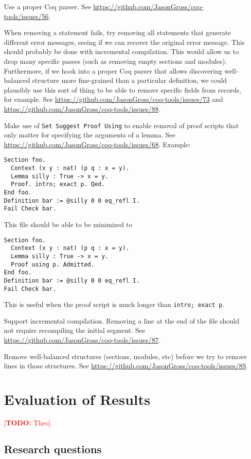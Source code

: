 \documentclass[sigplan,10pt,review,anonymous]{acmart}
\makeatletter
\newcommand{\todo}[1]{%
\@latex@warning{TODO: \detokenize{#1} on page \thepage}%
\textcolor{red}{[\textbf{TODO:} #1]}}%
\makeatother
\begin{document}
Use a proper Coq parser.
See \url{https://github.com/JasonGross/coq-tools/issues/56}.

When removing a statement fails, try removing all statements that generate different error messages, seeing if we can recover the original error message.
This should probably be done with incremental compilation.
This would allow us to drop many specific passes (such as removing empty sections and modules).
Furthermore, if we hook into a proper Coq parser that allows discovering well-balanced structure more fine-grained than a particular definition, we could plausibly use this sort of thing to be able to remove specific fields from records, for example.
See \url{https://github.com/JasonGross/coq-tools/issues/73} and \url{https://github.com/JasonGross/coq-tools/issues/88}.

Make use of \verb|Set Suggest Proof Using| to enable removal of proof scripts that only matter for specifying the arguments of a lemma.
See \url{https://github.com/JasonGross/coq-tools/issues/68}.
Example:
\begin{verbatim}
Section foo.
  Context (x y : nat) (p q : x = y).
  Lemma silly : True -> x = y.
  Proof. intro; exact p. Qed.
End foo.
Definition bar := @silly 0 0 eq_refl I.
Fail Check bar.
\end{verbatim}
This file should be able to be minimized to
\begin{verbatim}
Section foo.
  Context (x y : nat) (p q : x = y).
  Lemma silly : True -> x = y.
  Proof using p. Admitted.
End foo.
Definition bar := @silly 0 0 eq_refl I.
Fail Check bar.
\end{verbatim}
This is useful when the proof script is much longer than \verb|intro; exact p|.

Support incremental compilation.
Removing a line at the end of the file should not require recompiling the initial segment.
See \url{https://github.com/JasonGross/coq-tools/issues/87}.

Remove well-balanced structures (sections, modules, etc) before we try to remove lines in those structures.
See \url{https://github.com/JasonGross/coq-tools/issues/89}.

\section{Evaluation of Results}

\todo{Theo}

\subsection{Research questions}
\end{document}
